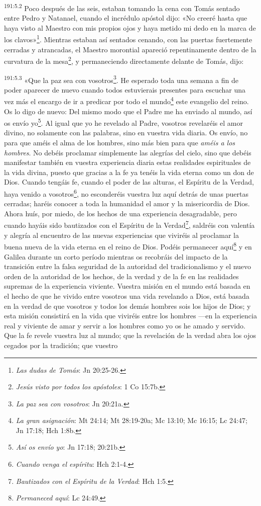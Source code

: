\par
\textsuperscript{191:5.2} Poco después de las seis, estaban tomando la cena con Tomás sentado entre Pedro y Natanael, cuando el incrédulo apóstol dijo: «No creeré hasta que haya visto al Maestro con mis propios ojos y haya metido mi dedo en la marca de los clavos»\footnote{\textit{Las dudas de Tomás}: Jn 20:25-26.}. Mientras estaban así sentados cenando, con las puertas fuertemente cerradas y atrancadas, el Maestro morontial apareció repentinamente dentro de la curvatura de la mesa\footnote{\textit{Jesús visto por todos los apóstoles}: 1 Co 15:7b.}, y permaneciendo directamente delante de Tomás, dijo:

\par
\textsuperscript{191:5.3} «Que la paz sea con vosotros\footnote{\textit{La paz sea con vosotros}: Jn 20:21a.}. He esperado toda una semana a fin de poder aparecer de nuevo cuando todos estuvierais presentes para escuchar una vez más el encargo de ir a predicar por todo el mundo\footnote{\textit{La gran asignación}: Mt 24:14; Mt 28:19-20a; Mc 13:10; Mc 16:15; Lc 24:47; Jn 17:18; Hch 1:8b.} este evangelio del reino. Os lo digo de nuevo: Del mismo modo que el Padre me ha enviado al mundo, así os envío yo\footnote{\textit{Así os envío yo}: Jn 17:18; 20:21b.}. Al igual que yo he revelado al Padre, vosotros revelaréis el amor divino, no solamente con las palabras, sino en vuestra vida diaria. Os envío, no para que améis el alma de los hombres, sino más bien para que \textit{améis a los hombres}. No debéis proclamar simplemente las alegrías del cielo, sino que debéis manifestar también en vuestra experiencia diaria estas realidades espirituales de la vida divina, puesto que gracias a la fe ya tenéis la vida eterna como un don de Dios. Cuando tengáis fe, cuando el poder de las alturas, el Espíritu de la Verdad, haya venido a vosotros\footnote{\textit{Cuando venga el espíritu}: Hch 2:1-4.}, no esconderéis vuestra luz aquí detrás de unas puertas cerradas; haréis conocer a toda la humanidad el amor y la misericordia de Dios. Ahora huís, por miedo, de los hechos de una experiencia desagradable, pero cuando hayáis sido bautizados con el Espíritu de la Verdad\footnote{\textit{Bautizados con el Espíritu de la Verdad}: Hch 1:5.}, saldréis con valentía y alegría al encuentro de las nuevas experiencias que viviréis al proclamar la buena nueva de la vida eterna en el reino de Dios. Podéis permanecer aquí\footnote{\textit{Permaneced aquí}: Lc 24:49.} y en Galilea durante un corto período mientras os recobráis del impacto de la transición entre la falsa seguridad de la autoridad del tradicionalismo y el nuevo orden de la autoridad de los hechos, de la verdad y de la fe en las realidades supremas de la experiencia viviente. Vuestra misión en el mundo está basada en el hecho de que he vivido entre vosotros una vida revelando a Dios, está basada en la verdad de que vosotros y todos los demás hombres sois los hijos de Dios; y esta misión consistirá en la vida que viviréis entre los hombres ---en la experiencia real y viviente de amar y servir a los hombres como yo os he amado y servido. Que la fe revele vuestra luz al mundo; que la revelación de la verdad abra los ojos cegados por la tradición; que vuestro 